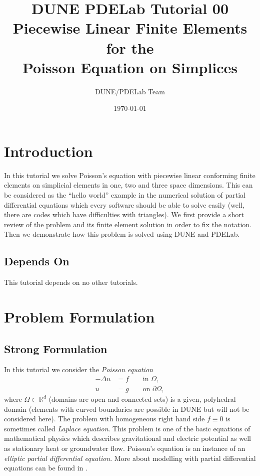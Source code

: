 \documentclass[a4paper,12pt]{article}
\title{DUNE PDELab Tutorial 00 \\ 
Piecewise Linear Finite Elements for the\\
Poisson Equation on Simplices}
\author{DUNE/PDELab Team}
\date{\today}
\begin{document}
\maketitle
\tableofcontents
\clearpage

\section{Introduction}

In this tutorial we solve Poisson's equation with piecewise linear conforming 
finite elements on simplicial elements in one, two and three space dimensions. 
This can be considered as the ``hello world''
example in the numerical solution of partial differential equations which
every software should be able to solve easily (well, there are codes which have
difficulties with triangles). We first provide a short review of the problem and
its finite element solution in order to fix the notation. Then we demonstrate
how this problem is solved using DUNE and PDELab.

\subsection*{Depends On} This tutorial depends on no other tutorials.

\section{Problem Formulation}

\subsection{Strong Formulation}

In this tutorial we consider the {\em Poisson equation}
\begin{subequations}
\begin{align}
-\Delta u & = f \qquad\text{in $\Omega$},\label{eq:1a}\\
u &= g \qquad\text{on $\partial\Omega$},\label{eq:1b}
\end{align}
\end{subequations}
where $\Omega\subset\mathbb{R}^d$ (domains are open and connected sets)
is a given, polyhedral domain (elements with curved
boundaries are possible in DUNE but will not be considered here). 
The problem with homogeneous right hand side $f\equiv 0$ is sometimes called
{\em Laplace equation}. This problem 
is one of the basic equations of mathematical physics which describes gravitational
and electric potential as well as stationary heat or groundwater flow.
Poisson's equation is an instance of an {\em elliptic partial differential equation}.
More about modelling with partial differential equations can be found in \cite{Eriksson,BastianII}.
\end{document}
